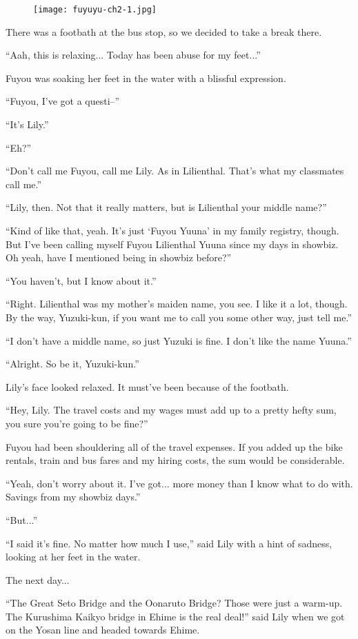 \begin{figure}[p]
\texttt{[image: fuyuyu-ch2-1.jpg]}
\end{figure}

There was a footbath at the bus stop, so we decided to take a break there.

``Aah, this is relaxing... Today has been abuse for my feet...''

Fuyou was soaking her feet in the water with a blissful expression.

``Fuyou, I've got a questi--''

``It's Lily.''

``Eh?''

``Don't call me Fuyou, call me Lily. As in Lilienthal. That's what my classmates call me.''

``Lily, then. Not that it really matters, but is Lilienthal your middle name?''

``Kind of like that, yeah. It's just `Fuyou Yuuna' in my family registry, though. But I've been calling myself Fuyou Lilienthal Yuuna since my days in showbiz. Oh yeah, have I mentioned being in showbiz before?''

``You haven't, but I know about it.''

``Right. Lilienthal was my mother's maiden name, you see. I like it a lot, though. By the way, Yuzuki-kun, if you want me to call you some other way, just tell me.''

``I don't have a middle name, so just Yuzuki is fine. I don't like the name Yuuna.''

``Alright. So be it, Yuzuki-kun.''

Lily's face looked relaxed. It must've been because of the footbath.

``Hey, Lily. The travel costs and my wages must add up to a pretty hefty sum, you sure you're going to be fine?''

Fuyou had been shouldering all of the travel expenses. If you added up the bike rentals, train and bus fares and my hiring costs, the sum would be considerable.

``Yeah, don't worry about it. I've got... more money than I know what to do with. Savings from my showbiz days.''

``But...''

``I said it's fine. No matter how much I use,'' said Lily with a hint of sadness, looking at her feet in the water.

The next day...

``The Great Seto Bridge and the Oonaruto Bridge? Those were just a warm-up. The Kurushima Kaikyo bridge in Ehime is the real deal!'' said Lily when we got on the Yosan line and headed towards Ehime.

